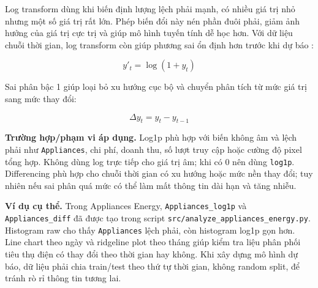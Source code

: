 Log transform dùng khi biến định lượng lệch phải mạnh, có nhiều giá trị nhỏ nhưng một số giá trị rất lớn. Phép biến đổi này nén phần đuôi phải, giảm ảnh hưởng của giá trị cực trị và giúp mô hình tuyến tính dễ học hơn. Với dữ liệu chuỗi thời gian, log transform còn giúp phương sai ổn định hơn trước khi dự báo \cite{Hyndman2021Forecasting}:

\begin{equation}
y'_t = \log(1 + y_t)
\end{equation}

Sai phân bậc 1 giúp loại bỏ xu hướng cục bộ và chuyển phân tích từ mức giá trị sang mức thay đổi:

\begin{equation}
\Delta y_t = y_t - y_{t-1}
\end{equation}

\textbf{Trường hợp/phạm vi áp dụng.} Log1p phù hợp với biến không âm và lệch phải như \texttt{Appliances}, chi phí, doanh thu, số lượt truy cập hoặc cường độ pixel tổng hợp. Không dùng log trực tiếp cho giá trị âm; khi có 0 nên dùng \texttt{log1p}. Differencing phù hợp cho chuỗi thời gian có xu hướng hoặc mức nền thay đổi; tuy nhiên nếu sai phân quá mức có thể làm mất thông tin dài hạn và tăng nhiễu.

\textbf{Ví dụ cụ thể.} Trong Appliances Energy, \texttt{Appliances\_log1p} và \texttt{Appliances\_diff} đã được tạo trong script \texttt{src/analyze\_appliances\_energy.py}. Histogram raw cho thấy \texttt{Appliances} lệch phải, còn histogram log1p gọn hơn. Line chart theo ngày và ridgeline plot theo tháng giúp kiểm tra liệu phân phối tiêu thụ điện có thay đổi theo thời gian hay không. Khi xây dựng mô hình dự báo, dữ liệu phải chia train/test theo thứ tự thời gian, không random split, để tránh rò rỉ thông tin tương lai.

